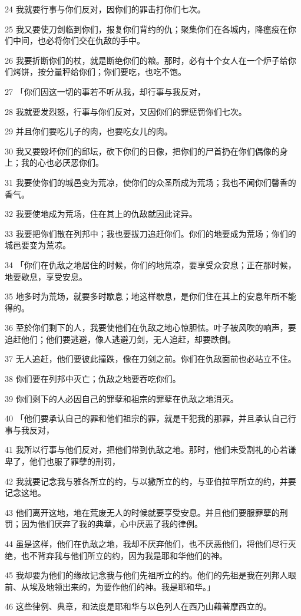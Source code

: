 \par 24 我就要行事与你们反对，因你们的罪击打你们七次。
\par 25 我又要使刀剑临到你们，报复你们背约的仇；聚集你们在各城内，降瘟疫在你们中间，也必将你们交在仇敌的手中。
\par 26 我要折断你们的杖，就是断绝你们的粮。那时，必有十个女人在一个炉子给你们烤饼，按分量秤给你们；你们要吃，也吃不饱。
\par 27 「你们因这一切的事若不听从我，却行事与我反对，
\par 28 我就要发烈怒，行事与你们反对，又因你们的罪惩罚你们七次。
\par 29 并且你们要吃儿子的肉，也要吃女儿的肉。
\par 30 我又要毁坏你们的邱坛，砍下你们的日像，把你们的尸首扔在你们偶像的身上；我的心也必厌恶你们。
\par 31 我要使你们的城邑变为荒凉，使你们的众圣所成为荒场；我也不闻你们馨香的香气。
\par 32 我要使地成为荒场，住在其上的仇敌就因此诧异。
\par 33 我要把你们散在列邦中；我也要拔刀追赶你们。你们的地要成为荒场；你们的城邑要变为荒凉。
\par 34 「你们在仇敌之地居住的时候，你们的地荒凉，要享受众安息；正在那时候，地要歇息，享受安息。
\par 35 地多时为荒场，就要多时歇息；地这样歇息，是你们住在其上的安息年所不能得的。
\par 36 至於你们剩下的人，我要使他们在仇敌之地心惊胆怯。叶子被风吹的响声，要追赶他们；他们要逃避，像人逃避刀剑，无人追赶，却要跌倒。
\par 37 无人追赶，他们要彼此撞跌，像在刀剑之前。你们在仇敌面前也必站立不住。
\par 38 你们要在列邦中灭亡；仇敌之地要吞吃你们。
\par 39 你们剩下的人必因自己的罪孽和祖宗的罪孽在仇敌之地消灭。
\par 40 「他们要承认自己的罪和他们祖宗的罪，就是干犯我的那罪，并且承认自己行事与我反对，
\par 41 我所以行事与他们反对，把他们带到仇敌之地。那时，他们未受割礼的心若谦卑了，他们也服了罪孽的刑罚，
\par 42 我就要记念我与雅各所立的约，与以撒所立的约，与亚伯拉罕所立的约，并要记念这地。
\par 43 他们离开这地，地在荒废无人的时候就要享受安息。并且他们要服罪孽的刑罚；因为他们厌弃了我的典章，心中厌恶了我的律例。
\par 44 虽是这样，他们在仇敌之地，我却不厌弃他们，也不厌恶他们，将他们尽行灭绝，也不背弃我与他们所立的约，因为我是耶和华他们的神。
\par 45 我却要为他们的缘故记念我与他们先祖所立的约。他们的先祖是我在列邦人眼前、从埃及地领出来的，为要作他们的神。我是耶和华。」
\par 46 这些律例、典章，和法度是耶和华与以色列人在西乃山藉著摩西立的。

